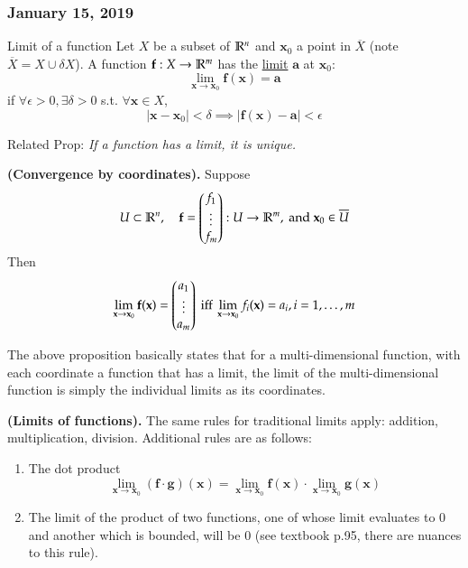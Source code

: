 \subsubsection*{January 15, 2019}

\begin{defn}{Limit of a function}
Let $X$ be a subset of $\mathbb{R}^n$ and $\bm{x}_0$ a point in $\overline{X}$ (note $\overline{X}=X\cup \delta X$). A function $\textbf{f} : X \rightarrow \mathbb{R}^m$ has the \ul{limit} $\bm{a}$ at $\bm{x}_0$:
\begin{equation}
	\lim_{\bm{x}\rightarrow \bm{x}_0}\bm{f}(\bm{x}) = \bm{a}
\end{equation}
if $\forall \epsilon > 0, \exists\delta > 0$ s.t. $\forall\bm{x}\in X$,
\begin{equation}
	|\bm{x}-\bm{x}_0|<\delta \implies |\bm{f}(\bm{x})-\bm{a}|<\epsilon
\end{equation}

Related Prop: \emph{If a function has a limit, it is unique. }
\end{defn}

\begin{proposition}
\textbf{(Convergence by coordinates).} Suppose
\begin{equation}
	U\subset \mathbb{R}^n, \quad \textbf{f}=\begin{pmatrix} f_1 \\ \vdots \\ f_m \end{pmatrix}: U\rightarrow \mathbb{R}^m,\text{ and }\textbf{x}_0\in\overline{U}
\end{equation}
Then
\begin{equation}
	\lim_{\textbf{x}\to\textbf{x}_0} \textbf{f}(\textbf{x})=\begin{pmatrix} a_1 \\ \vdots \\ a_m \end{pmatrix}\text{ iff }\lim_{\textbf{x}\to\textbf{x}_0} f_i(\textbf{x})=a_i, i=1,\dots,m
\end{equation}
\end{proposition}

The above proposition basically states that for a multi-dimensional function, with each coordinate a function that has a limit, the limit of the multi-dimensional function is simply the individual limits as its coordinates. 

\begin{theorem}
  \textbf{(Limits of functions).} The same rules for traditional limits apply: addition, multiplication, division. Additional rules are as follows:
  \begin{enumerate}
    \item The dot product
    \[\lim_{\bm{x}\to\bm{x}_0}(\bm{f} \cdot \bm{g})(\bm{x})=\lim_{\bm{x}\to\bm{x}_0}\bm{f}(\bm{x})\cdot \lim_{\bm{x}\to\bm{x}_0}\bm{g}(\bm{x})\]
    \item The limit of the product of two functions, one of whose limit evaluates to $0$ and another which is bounded, will be $0$ (see textbook p.95, there are nuances to this rule).
  \end{enumerate}
\end{theorem}

